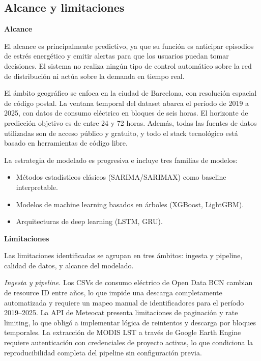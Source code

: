 \documentclass[12pt, a4paper]{article}
\begin{document}
\subsection{Alcance y limitaciones}


\textbf{Alcance}

El alcance es principalmente predictivo, ya que su función es anticipar episodios de estrés energético y emitir alertas para que los usuarios puedan tomar decisiones. El sistema no realiza ningún tipo de control automático sobre la red de distribución ni actúa sobre la demanda en tiempo real.

El ámbito geográfico se enfoca en la ciudad de Barcelona, con resolución espacial de código postal. La ventana temporal del dataset abarca el período de 2019 a 2025, con datos de consumo eléctrico en bloques de seis horas. El horizonte de predicción objetivo es de entre 24 y 72 horas. Además, todas las fuentes de datos utilizadas son de acceso público y gratuito, y todo el stack tecnológico está basado en herramientas de código libre.

La estrategia de modelado es progresiva e incluye tres familias de modelos:
\begin{itemize}
  \item Métodos estadísticos clásicos (SARIMA/SARIMAX) como baseline interpretable.
  \item Modelos de machine learning basados en árboles (XGBoost, LightGBM).
  \item Arquitecturas de deep learning (LSTM, GRU).
\end{itemize}


\textbf{Limitaciones}

Las limitaciones identificadas se agrupan en tres ámbitos: ingesta y pipeline, calidad de datos, y alcance del modelado.

\textit{Ingesta y pipeline.} Los CSVs de consumo eléctrico de Open Data BCN cambian de resource ID entre años, lo que impide una descarga completamente automatizada y requiere un mapeo manual de identificadores para el período 2019--2025. La API de Meteocat presenta limitaciones de paginación y rate limiting, lo que obligó a implementar lógica de reintentos y descarga por bloques temporales. La extracción de MODIS LST a través de Google Earth Engine requiere autenticación con credenciales de proyecto activas, lo que condiciona la reproducibilidad completa del pipeline sin configuración previa.
\end{document}
